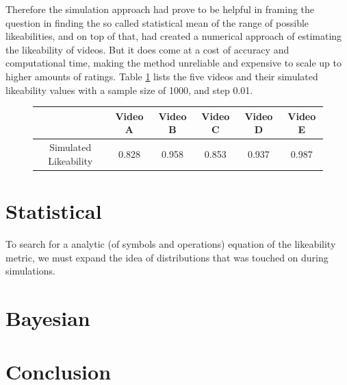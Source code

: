 \documentclass[a4paper,11pt]{article}
\begin{document}
Therefore the simulation approach had prove to be helpful in framing the question in finding the so called statistical mean of the range of possible likeabilities, and on top of that, had created a numerical approach of estimating the likeability of videos. But it does come at a cost of accuracy and computational time, making the method unreliable and expensive to scale up to higher amounts of ratings. Table \ref{tbl:simulation} lists the five videos and their simulated likeability values with a sample size of 1000, and step 0.01.

\begin{figure}[H]
    \centering
    \begin{tabular}{c|c|c|c|c|c}
        & Video A & Video B & Video C & Video D & Video E \\
        \hline
        \hline
        Simulated Likeability & 0.828 & 0.958 &  0.853 & 0.937 & 0.987
    \end{tabular}
    \label{tbl:simulation}
\end{figure}

\section{Statistical}

To search for a analytic (of symbols and operations) equation of the likeability metric, we must expand the idea of distributions that was touched on during simulations.




\section{Bayesian}

\section{Conclusion}

\end{document}
